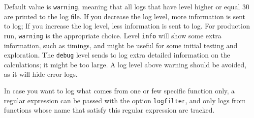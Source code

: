 Default value is \verb+warning+,
meaning that all logs that have level higher or equal 30 are printed to the log file.
If you decrease the log level, more information is sent to log;
If you increase the log level, less information is sent to log.
For production run, \verb+warning+ is the appropriate choice.
Level \verb+info+ will show some extra information, such as timings,
and might be useful for some initial testing and exploration.
The \verb+debug+ level sends to log extra detailed information on the calculations;
it might be too large.
A log level above warning should be avoided, as it will hide error logs.

In case you want to log what comes from one or few specific function only,
a regular expression can be passed with the option \verb+logfilter+,
and only logs from functions whose name that satisfy this regular expression are tracked.



